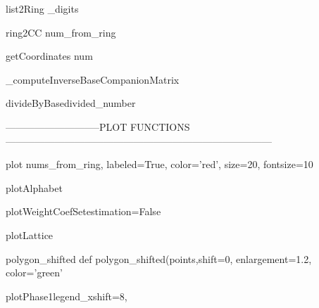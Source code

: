 \begin{method}{list2Ring}{ \_digits}

\end{method}


\begin{method}{ring2CC}{ num\_from\_ring}

\end{method}


\begin{method}{getCoordinates}{ num}

\end{method}


\begin{method}{\_computeInverseBaseCompanionMatrix}{}

\end{method}


\begin{method}{divideByBase}{divided\_number}

\end{method}

-----------------------------PLOT FUNCTIONS---------------------------------------------------------------------------------

\begin{method}{plot}{ nums\_from\_ring, labeled=True, color='red', size=20, fontsize=10}

\end{method}


\begin{method}{plotAlphabet}{}

\end{method}


\begin{method}{plotWeightCoefSet}{estimation=False}

\end{method}


\begin{method}{plotLattice}{}

\end{method}


\begin{method}{polygon\_shifted}{    def polygon\_shifted(points,shift=0, enlargement=1.2, color='green'}

\end{method}


\begin{method}{plotPhase1}{legend\_xshift=8,}

\end{method}


